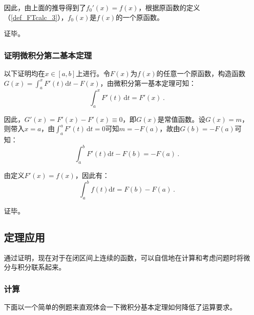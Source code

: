 因此，由上面的推导得到了$f_0'(x)=f(x)$，根据原函数的定义（\autoref{def_FTcalc_3}），$f_0(x)$是$f(x)$的一个原函数。

证毕。

\subsubsection{证明微积分第二基本定理}

以下证明均在$x\in[a,b]$上进行。令$F(x)$为$f(x)$的任意一个原函数，构造函数$G(x)=\int_{a}^{x} F'(t)\mathrm {d}t-F(x)$，由微积分第一基本定理可知：
\begin{equation}
\int_{a}^{x} F'(t)\, \mathrm {d}t=F'(x)~.
\end{equation}

因此，$G'(x)=F'(x)-F'(x)\equiv0$，即$G(x)$是常值函数。设$G(x)=m$，则带入$x=a$，由$\int_{a}^{a} F'(t)\, \mathrm {d}t=0$可知$m=-F(a)$，故由$G(b)=-F(a)$可知：
\begin{equation}
\int_{a}^{b} F'(t)\mathrm {d}t-F(b)=-F(a)~.
\end{equation}

由定义$F'(x)=f(x)$，因此有：
\begin{equation}
\int_{a}^{b} f(t)\mathrm {d}t=F(b)-F(a)~.
\end{equation}

证毕。

\subsection{定理应用}

通过证明，现在对于在闭区间上连续的函数，可以自信地在计算和考虑问题时将微分与积分联系起来。

\subsubsection{计算}

下面以一个简单的例题来直观体会一下微积分基本定理如何降低了运算要求。

